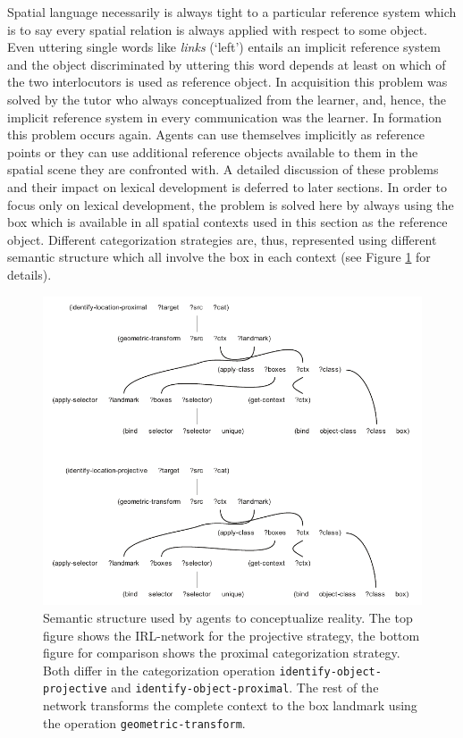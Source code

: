 Spatial language necessarily is always tight to a particular reference system which
is to say every spatial relation is always applied with respect to some
object. Even uttering single words like \textit{links} (`left') entails an implicit reference
system and the object discriminated by uttering this word depends at least on which
of the two interlocutors is used as reference object. In acquisition this problem 
was solved by the tutor who always conceptualized from the learner, and, hence, 
the implicit reference system in every communication was the learner. In formation
this problem occurs again. Agents can use themselves implicitly as reference points
or they can use additional reference objects available to them in the spatial
scene they are confronted with. A detailed discussion of these
problems and their impact on lexical development is deferred to later sections. 
In order to focus only on lexical development, the problem is solved here by 
always using the box which is available in all spatial
contexts used in this section as the reference object. Different categorization 
strategies are, thus, represented using different semantic structure which all 
involve the box in each context (see Figure \ref{f:categorization-strategies} for
details).

\begin{figure}
\begin{center}
\includegraphics[width=1.0\columnwidth]{figs/category-formation-categorization-strategies}
\end{center}
\caption[Example strategies used in conceptualization]{%
Semantic structure used by agents to conceptualize reality. The top figure
shows the IRL-network for the projective strategy, the bottom figure for
comparison shows the proximal categorization strategy. Both differ in 
the categorization operation {\footnotesize\tt identify-object-projective} and
{\footnotesize\tt identify-object-proximal}. The rest of the network
transforms the complete context to the box landmark using the operation 
{\footnotesize\tt geometric-transform}.}
\label{f:categorization-strategies}
\end{figure}

